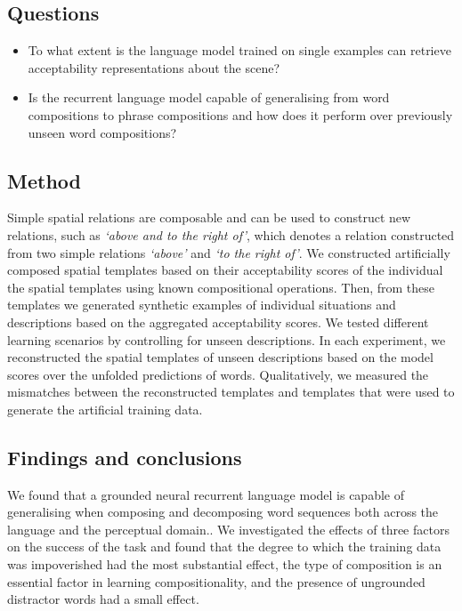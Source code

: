 \subsection{Questions}

\begin{itemize}
	\item To what extent is the language model trained on single examples can retrieve acceptability representations about the scene? 
	\item Is the recurrent language model capable of generalising from word compositions to phrase compositions and how does it perform over previously unseen word compositions?
\end{itemize}

\subsection{Method}
Simple spatial relations are composable and can be used to construct new relations, such as \emph{`above and to the right of'}, which denotes a relation constructed from two simple relations \emph{`above'} and \emph{`to the right of'}. We constructed artificially composed spatial templates based on their acceptability scores
of the individual
the spatial templates \citep{logan1996computational} using known compositional operations. 
Then, from these templates we generated synthetic 
examples of individual situations and descriptions based on the aggregated acceptability scores.
We tested different learning scenarios by controlling for unseen descriptions. 
In each experiment, we reconstructed the spatial templates of unseen descriptions based on the model scores over
the unfolded predictions of words.
Qualitatively, we measured the mismatches between the reconstructed templates and 
templates that were used to generate the artificial training data.

\subsection{Findings and conclusions}
We found that a grounded neural recurrent language model is capable of generalising when composing and decomposing word sequences both across the language and the perceptual domain.. 
We investigated the effects of three factors on the success of the task and found that the degree to which the training data was impoverished had the most substantial effect, the type of composition is an essential factor in learning compositionality, and the presence of ungrounded distractor words had a small effect.

